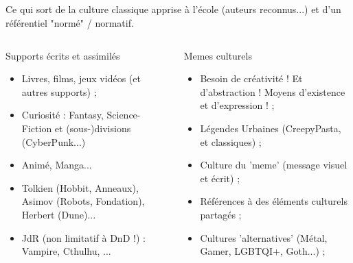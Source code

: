 \documentclass[slidetop,11pt]{beamer}
\begin{document}
\subsection{\titleSubSectionDefinitionPopCulture }
\begin{frame}
	\frametitle{\titleSubSectionDefinitionPopCulture }
	\footnotesize 
	\footnotesize 
	Ce qui sort de la culture classique apprise {\`a} l'{\'e}cole (auteurs reconnus...) et d'un r{\'e}f{\'e}rentiel "norm{\'e}" / normatif. 
	\begin{columns}[T]
	\begin{column}[T]{5.0cm}
		\begin{block}{Supports {\'e}crits et assimil{\'e}s}
			\begin{itemize}
				\item Livres, films, jeux vid{\'e}os (et autres supports) ; 
				\item Curiosit{\'e} : Fantasy, Science-Fiction et (sous-)divisions (CyberPunk...)
				\item Anim{\'e}, Manga...
				\item Tolkien (Hobbit, Anneaux), Asimov (Robots, Fondation), Herbert (Dune)... 
				\item JdR (non limitatif {\`a} DnD !) : Vampire, Cthulhu, ... 
			\end{itemize}
		\end{block}
	\end{column}
	\begin{column}[T]{5.0cm}
		\begin{block}{Memes culturels}
			\begin{itemize}
				\item Besoin de cr{\'e}ativit{\'e} ! Et d'abstraction ! Moyens d'existence et d'expression ! ; 
				\item L{\'e}gendes Urbaines (CreepyPasta, et classiques) ; 
				\item Culture du 'meme' (message visuel et {\'e}crit) ; 
				\item R{\'e}f{\'e}rences {\`a} des {\'e}l{\'e}ments culturels partag{\'e}s ; 
				\item Cultures 'alternatives' (M{\'e}tal, Gamer, LGBTQI+, Goth...) ; 
			\end{itemize}
		\end{block}
	\end{column}
	\end{columns}~\\
\end{frame}
\end{document}
